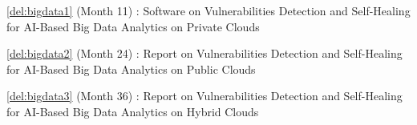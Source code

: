 \begin{Workpackage}{\thewpno}





\begin{WPDeliverables}
  \begin{compactitem}
\item \ref{del:bigdata1} (Month 11) : Software on Vulnerabilities Detection and Self-Healing for AI-Based Big Data Analytics on Private Clouds
 \item \ref{del:bigdata2} (Month 24) : Report on Vulnerabilities Detection and Self-Healing for AI-Based Big Data Analytics on Public Clouds 
 \item \ref{del:bigdata3} (Month 36) : Report on Vulnerabilities Detection and Self-Healing for AI-Based Big Data Analytics on Hybrid Clouds      
\end{compactitem}
\end{WPDeliverables}
\end{Workpackage}
